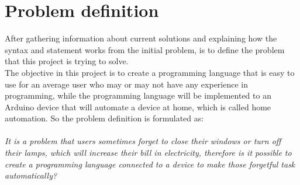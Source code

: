 \section{Problem definition}
 After gathering information about current solutions and explaining how the syntax and statement works from the initial problem, is to define the problem that this project is trying to solve. \\ The objective in this project is to create a programming language that is easy to use for an average user who may or may not have any experience in programming, while the programming language will be implemented to an Arduino device that will automate a device at home, which is called home automation. So the problem definition is formulated as:\\
\\
\textit{It is a problem that users sometimes forget to close their windows or turn off their lamps, which will increase their bill in electricity, therefore is it possible to create a programming language connected to a device to make those forgetful task automatically?}


